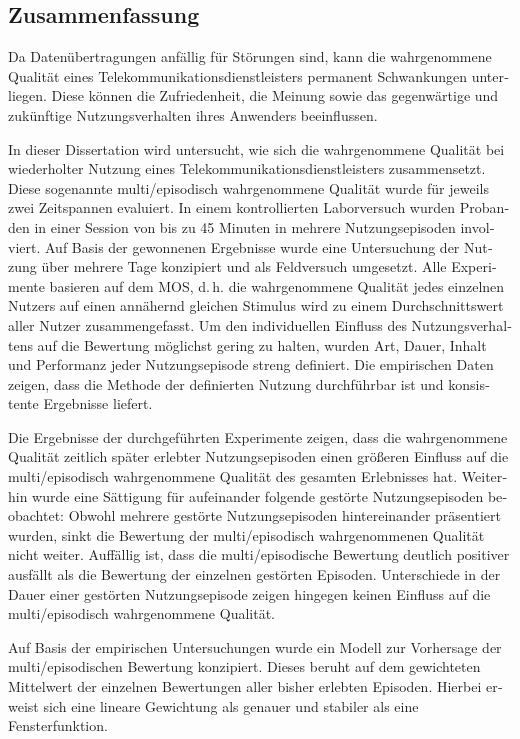 \begin{otherlanguage}{ngerman}
\chapter*{Zusammenfassung}
Da Datenübertragungen anfällig für Störungen sind, kann die wahrgenommene Qualität eines Telekommunikationsdienstleisters permanent Schwankungen unterliegen.
Diese können die Zufriedenheit, die Meinung sowie das gegenwärtige und zukünftige Nutzungsverhalten ihres Anwenders beeinflussen. 

In dieser Dissertation wird untersucht, wie sich die wahrgenommene Qualität bei wiederholter Nutzung eines Telekommunikationsdienstleisters zusammensetzt.
Diese sogenannte multi\-/episodisch wahrgenommene Qualität wurde für jeweils zwei Zeitspannen evaluiert.
In einem kontrollierten Laborversuch wurden Probanden in einer Session von bis zu 45 Minuten in mehrere Nutzungsepisoden involviert.
Auf Basis der gewonnenen Ergebnisse wurde eine Untersuchung der Nutzung über mehrere Tage konzipiert und als Feldversuch umgesetzt.
Alle Experimente basieren auf dem \acf{MOS}, d.\,h. die wahrgenommene Qualität jedes einzelnen Nutzers auf einen annähernd gleichen Stimulus wird zu einem Durchschnittswert aller Nutzer zusammengefasst. 
Um den individuellen Einfluss des Nutzungsverhaltens auf die Bewertung möglichst gering zu halten, wurden Art, Dauer, Inhalt und Performanz jeder Nutzungsepisode streng definiert.
Die empirischen Daten zeigen, dass die Methode der definierten Nutzung durchführbar ist und konsistente Ergebnisse liefert.

Die Ergebnisse der durchgeführten Experimente zeigen, dass die wahrgenommene Qualität zeitlich später erlebter Nutzungsepisoden einen größeren Einfluss auf die multi\-/episodisch wahrgenommene Qualität des gesamten Erlebnisses hat.
Weiterhin wurde eine Sättigung für aufeinander folgende gestörte Nutzungsepisoden beobachtet: Obwohl mehrere gestörte Nutzungsepisoden hintereinander präsentiert wurden, sinkt die Bewertung der multi\-/episodisch wahrgenommenen Qualität nicht weiter.
Auffällig ist, dass die multi\-/episodische Bewertung deutlich positiver ausfällt als die Bewertung der einzelnen gestörten Episoden.
Unterschiede in der Dauer einer gestörten Nutzungsepisode zeigen hingegen keinen Einfluss auf die multi\-/episodisch wahrgenommene Qualität. 


Auf Basis der empirischen Untersuchungen wurde ein Modell zur Vorhersage der multi\-/episodischen Bewertung konzipiert.
Dieses beruht auf dem gewichteten Mittelwert der einzelnen Bewertungen aller bisher erlebten Episoden.
Hierbei erweist sich eine lineare Gewichtung als genauer und stabiler als eine Fensterfunktion. 

\end{otherlanguage}
